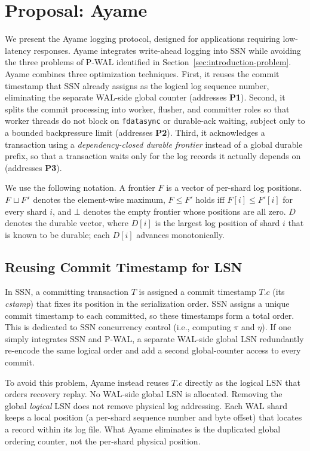 \section{Proposal: Ayame}
\label{sec:design}

We present the Ayame logging protocol, designed for applications requiring low-latency responses.
Ayame integrates write-ahead logging into SSN while avoiding the three problems of P-WAL identified in
Section~\ref{sec:introduction-problem}.  
%
Ayame combines three optimization techniques.
%
First, it reuses the commit timestamp that SSN already assigns as the logical log sequence number, eliminating the separate WAL-side global counter (addresses \textbf{P1}).  
%
Second, it splits the commit processing into worker, flusher, and committer roles so that worker threads do not
block on \texttt{fdatasync} or durable-ack waiting, subject only to a bounded backpressure limit (addresses \textbf{P2}).
%
Third, it acknowledges a transaction using a \emph{dependency-closed durable frontier} instead of a global durable prefix, so that a transaction waits only for the log records it actually depends on (addresses \textbf{P3}).

We use the following notation.  A frontier $F$ is a vector of per-shard log positions.  $F \sqcup F'$ denotes the element-wise maximum, $F \le F'$ holds iff $F[i] \le F'[i]$ for every shard $i$, and $\bot$ denotes the empty frontier whose positions are all zero.  $D$ denotes the durable vector, where $D[i]$ is the largest log position of shard $i$ that is known to be durable; each $D[i]$ advances monotonically.

\subsection{Reusing Commit Timestamp for LSN}
\label{sec:cstamp}

In SSN, a committing transaction $T$ is assigned a commit timestamp $T.c$ (its \emph{cstamp}) that fixes its position in the serialization order.  
%
SSN assigns a unique commit timestamp to each committed, so these timestamps form a total order.
This is dedicated to SSN concurrency control (i.e., computing $\pi$ and $\eta$).
%
If one simply integrates SSN and P-WAL, a separate WAL-side global LSN redundantly re-encode the
same logical order and add a second global-counter access to every commit.  
%

To avoid this problem, Ayame instead reuses $T.c$ directly as the logical LSN that orders recovery replay. No WAL-side global LSN is allocated.
%
Removing the global \emph{logical} LSN does not remove physical log addressing.  Each WAL shard keeps a local position (a per-shard sequence number and byte offset) that locates a record within its log file.  What Ayame eliminates is the duplicated global ordering counter, not the per-shard physical position.

